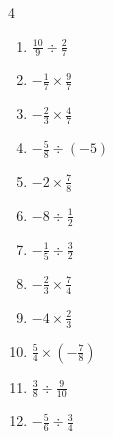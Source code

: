 \begin{multicols}{4}
\begin{enumerate}
  \item $\displaystyle \frac{10}{9}\div{}\frac{2}{7}$


  \item $\displaystyle -\frac{1}{7}\times{}\frac{9}{7}$


  \item $\displaystyle -\frac{2}{3}\times{}\frac{4}{7}$


  \item $\displaystyle -\frac{5}{8}\div{}\left(-5\right)$


  \item $\displaystyle -2\times{}\frac{7}{8}$


  \item $\displaystyle -8\div{}\frac{1}{2}$

        \phantom{$\displaystyle =-16$}

  \item $\displaystyle -\frac{1}{5}\div{}\frac{3}{2}$


  \item $\displaystyle -\frac{2}{3}\times{}\frac{7}{4}$


  \item $\displaystyle -4\times{}\frac{2}{3}$


  \item $\displaystyle \frac{5}{4}\times{}\left(-\frac{7}{8}\right)$


\columnbreak %

  \item $\displaystyle \frac{3}{8}\div{}\frac{9}{10}$


  \item $\displaystyle -\frac{5}{6}\div{}\frac{3}{4}$


\end{enumerate}
\end{multicols}
